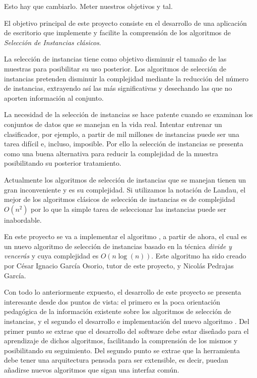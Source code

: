 Esto hay que cambiarlo. Meter nuestros objetivos y tal.

El objetivo principal de este proyecto consiste en el desarrollo de una aplicación de escritorio que implemente y facilite la comprensión de los algoritmos de \textit{Selección de Instancias clásicos}.

La selección de instancias tiene como objetivo disminuir el tamaño de las muestras para posibilitar su uso posterior. Los algoritmos de selección de instancias pretenden disminuir la complejidad mediante la reducción del número de instancias, extrayendo así las más significativas y desechando las que no aporten información al conjunto.

La necesidad de la selección de instancias se hace patente cuando se examinan los conjuntos de datos que se manejan en la vida real. Intentar entrenar un clasificador, por ejemplo, a partir de mil millones de instancias puede ser una tarea difícil e, incluso, imposible. Por ello la selección de instancias se presenta como una buena alternativa para reducir la complejidad de la muestra posibilitando su posterior tratamiento.

Actualmente los algoritmos de selección de instancias que se manejan tienen un gran inconveniente y es su complejidad. Si utilizamos la notación de Landau, el mejor de los algoritmos clásicos de selección de instancias es de complejidad $ O(n^{2}) $ por lo que la simple tarea de seleccionar las instancias puede ser inabordable.

En este proyecto se va a implementar el algoritmo \demois{} \cite{democratic_instance_selection}, \dis{} a partir de ahora, el cual es un nuevo algoritmo de selección de instancias basado en la técnica \textit{divide y vencerás} y cuya complejidad es $ O(n \log(n)) $. Este algoritmo ha sido creado por César Ignacio García Osorio, tutor de este proyecto, y Nicolás Pedrajas García.

Con todo lo anteriormente expuesto, el desarrollo de este proyecto se presenta interesante desde dos puntos de vista: el primero es la poca orientación pedagógica de la información existente sobre los algoritmos de selección de instancias, y el segundo el desarrollo e implementación del nuevo algoritmo \dis{}. Del primer punto se extrae que el desarrollo del software debe estar diseñado para el aprendizaje de dichos algoritmos, facilitando la comprensión de los mismos y posibilitando su seguimiento. Del segundo punto se extrae que la herramienta debe tener una arquitectura pensada para ser extensible, es decir, puedan añadirse nuevos algoritmos que sigan una interfaz común.

